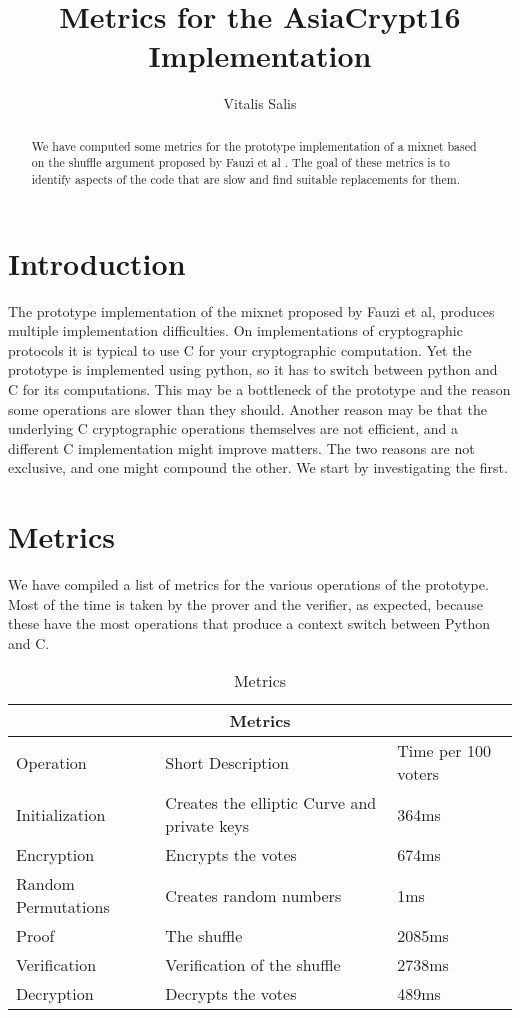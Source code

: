 \documentclass{article}
\date{}
\begin{document}
\title{Metrics for the AsiaCrypt16 Implementation} 

\author{Vitalis Salis}

\maketitle
\begin{abstract}
  We have computed some metrics for the prototype implementation
  \cite{prototype} of a mixnet based on the shuffle argument proposed
  by Fauzi et al \cite{shufflearg}. The goal of these metrics is to
  identify aspects of the code that are slow and find suitable
  replacements for them.
\end{abstract}

\section{Introduction}

The prototype implementation of the mixnet proposed by Fauzi et al,
produces multiple implementation difficulties. On implementations of
cryptographic protocols it is typical to use C for your cryptographic
computation. Yet the prototype is implemented using python, so it has
to switch between python and C for its computations. This may be a
bottleneck of the prototype and the reason some operations are slower
than they should. Another reason may be that the underlying C
cryptographic operations themselves are not efficient, and a different
C implementation might improve matters. The two reasons are not
exclusive, and one might compound the other. We start by investigating
the first. 

\section{Metrics}

We have compiled a list of metrics for the various operations of the
prototype. Most of the time is taken by the prover and the verifier,
as expected, because these have the most operations that produce a
context switch between Python and C.

\begin{table}
\begin{tabular}{ |p{3cm}|p{5cm}|p{3cm}|  }
    \hline
    \multicolumn{3}{|c|}{Metrics}\\
    \hline
    Operation & Short Description & Time per 100 voters\\
    \hline
    Initialization & Creates the elliptic Curve and private keys & 364ms\\
    Encryption & Encrypts the votes & 674ms\\
    Random Permutations & Creates random numbers & 1ms\\
    Proof & The shuffle & 2085ms\\
    Verification & Verification of the shuffle & 2738ms\\
    Decryption & Decrypts the votes & 489ms\\
    \hline
\end{tabular}
\caption{Metrics}
\end{table}
\end{document}
